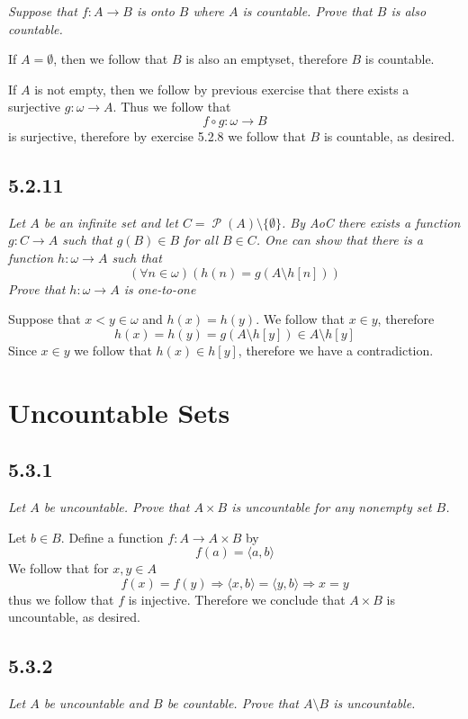 \documentclass[11pt,oneside,titlepage]{book}
\DeclareMathOperator \pow {\mathcal {P}}
\DeclareMathOperator \ra {\Rightarrow}
\newcommand{\eangle}[1]{\langle #1 \rangle}
\begin{document}
\textit{Suppose that $f: A \to B$ is onto $B$ where $A$ is countable. Prove that $B$ is
  also countable.}

If $A = \emptyset$, then we follow that $B$ is also an emptyset, therefore $B$ is countable.

If $A$ is not empty, then we follow by previous exercise that there exists a surjective
$g: \omega \to A$. Thus we follow that
$$f \circ g: \omega \to B$$
is surjective, therefore by exercise 5.2.8 we follow that $B$ is countable, as desired.


\subsection*{5.2.11}

\textit{Let $A$ be an infinite set and let $C = \pow(A) \setminus \{\emptyset\}$.
  By AoC there exists a function $g: C \to A$ such that $g(B) \in B$ for all $B \in C$.
  One can show that there is a function $h: \omega \to A$ such that
  $$(\forall n \in \omega )(h(n) = g(A \setminus h[n]))$$
  Prove that $h: \omega \to A$ is one-to-one}

Suppose that $x < y \in \omega$ and $h(x) = h(y)$. We follow that $x \in y$,
therefore
$$h(x) = h(y) = g(A \setminus h[y]) \in A \setminus h[y]$$
Since $x \in y$ we follow that $h(x) \in h[y]$, therefore we have a contradiction.


\section{Uncountable Sets}

\subsection*{5.3.1}

\textit{Let $A$ be uncountable. Prove that $A \times B$ is uncountable for any nonempty
  set $B$.}

Let $b \in B$. Define a function $f: A \to A \times B$ by
$$f(a) = \eangle{a, b}$$
We follow that for $x, y \in A$
$$f(x) = f(y) \ra \eangle{x, b}  = \eangle{y, b} \ra x = y$$
thus we follow that $f$ is injective. Therefore we conclude that $A \times B$ is
uncountable, as desired.

\subsection*{5.3.2}

\textit{Let $A$ be uncountable and $B$ be countable. Prove that $A \setminus B$ is
  uncountable.}
\end{document}
